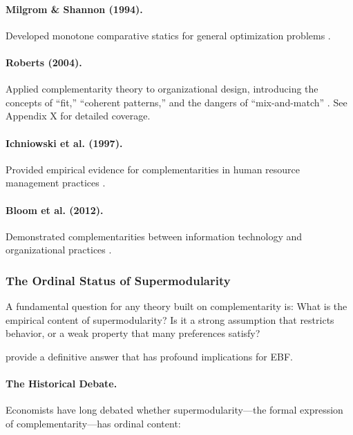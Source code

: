 \paragraph{Milgrom \& Shannon (1994).}
Developed monotone comparative statics for general optimization problems 
\citep{milgromshannon1994}.

\paragraph{Roberts (2004).}
Applied complementarity theory to organizational design, introducing the 
concepts of ``fit,'' ``coherent patterns,'' and the dangers of ``mix-and-match'' 
\citep{roberts2004}. See Appendix X for detailed coverage.

\paragraph{Ichniowski et al. (1997).}
Provided empirical evidence for complementarities in human resource management 
practices \citep{ichniowski1997}.

\paragraph{Bloom et al. (2012).}
Demonstrated complementarities between information technology and organizational 
practices \citep{bloom2012}.



\subsubsection{The Ordinal Status of Supermodularity}
\label{sec:ordinal-status}

A fundamental question for any theory built on complementarity is: 
What is the empirical content of supermodularity? Is it a strong assumption 
that restricts behavior, or a weak property that many preferences satisfy?

\citet{chambers2009supermodularity} provide a definitive answer that has 
profound implications for EBF.

\paragraph{The Historical Debate.}
Economists have long debated whether supermodularity---the formal expression 
of complementarity---has ordinal content:

